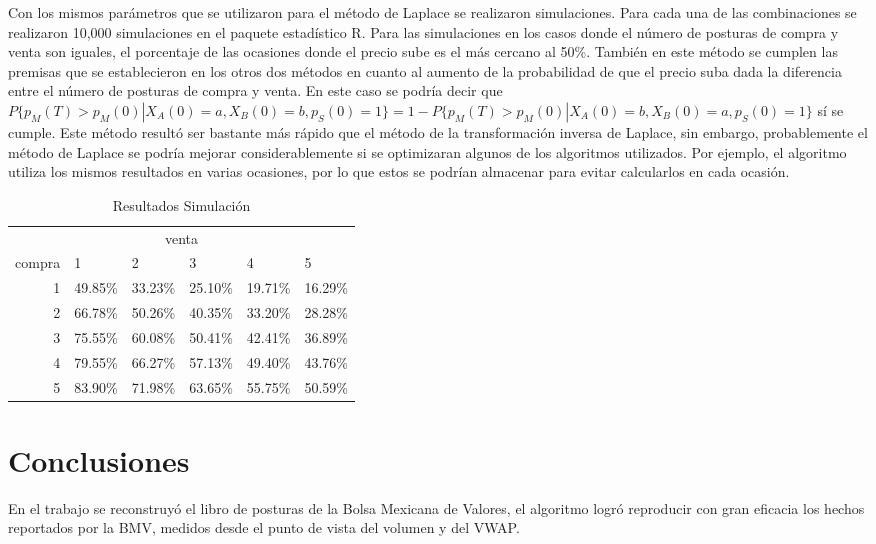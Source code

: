 \documentclass[11pt]{article}
\numberwithin{equation}{section} %
\begin{document}
Con los mismos parámetros que se utilizaron para el método de Laplace se realizaron simulaciones. Para cada una de las combinaciones se realizaron 10,000 simulaciones en el paquete estadístico R. Para las simulaciones en los casos donde el número de posturas de compra y venta son iguales, el porcentaje de las ocasiones donde el precio sube es el más cercano al 50\%. También en este método se cumplen las premisas que se establecieron en los otros dos métodos en cuanto al aumento de la probabilidad de que el precio suba dada la diferencia entre el número de posturas de compra y venta. En este caso se podría decir que $P\{p_M(T)>p_M(0)|X_A(0)=a,X_B(0)=b,p_S(0)=1\}=1-P\{p_M(T)>p_M(0)|X_A(0)=b,X_B(0)=a,p_S(0)=1\}$ sí se cumple. Este método resultó ser bastante más rápido que el método de la transformación inversa de Laplace, sin embargo, probablemente el método de Laplace se podría mejorar considerablemente si se optimizaran algunos de los algoritmos utilizados. Por ejemplo, el algoritmo utiliza los mismos resultados en varias ocasiones, por lo que estos se podrían almacenar para evitar calcularlos en cada ocasión.

\begin{table}[htbp]
\centering
\caption{Resultados Simulación}
\begin{tabular}{r|p{1.5cm}|p{1.5cm}|p{1.5cm}|p{1.5cm}|p{1.5cm}|}
\multicolumn{6}{c}{venta}\\
\cline{2-6}
compra & 1& 2 & 3 & 4 & 5 \\
\cline{2-6}
1 & 49.85\% & 33.23\% & 25.10\% & 19.71\% & 16.29\% \\
2 & 66.78\% & 50.26\% & 40.35\% & 33.20\% & 28.28\% \\
3 & 75.55\% & 60.08\% & 50.41\% & 42.41\% & 36.89\% \\
4 & 79.55\% & 66.27\% & 57.13\% & 49.40\% & 43.76\% \\
5 & 83.90\% & 71.98\% & 63.65\% & 55.75\% & 50.59\% \\
\cline{2-6}
\end{tabular}%
\label{tab:ressim}%
\end{table}%

\clearpage

\section{Conclusiones}

En el trabajo se reconstruyó el libro de posturas de la Bolsa Mexicana de Valores, el algoritmo logró reproducir con gran eficacia los hechos reportados por la BMV, medidos desde el punto de vista del volumen y del VWAP.\\
\end{document}
